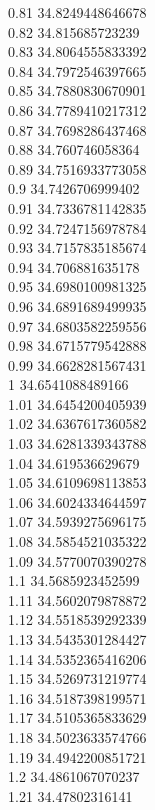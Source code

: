 {0.81	34.8249448646678\\
0.82	34.815685723239\\
0.83	34.8064555833392\\
0.84	34.7972546397665\\
0.85	34.7880830670901\\
0.86	34.7789410217312\\
0.87	34.7698286437468\\
0.88	34.760746058364\\
0.89	34.7516933773058\\
0.9	34.7426706999402\\
0.91	34.7336781142835\\
0.92	34.7247156978784\\
0.93	34.7157835185674\\
0.94	34.706881635178\\
0.95	34.6980100981325\\
0.96	34.6891689499935\\
0.97	34.6803582259556\\
0.98	34.6715779542888\\
0.99	34.6628281567431\\
1	34.6541088489166\\
1.01	34.6454200405939\\
1.02	34.6367617360582\\
1.03	34.6281339343788\\
1.04	34.619536629679\\
1.05	34.6109698113853\\
1.06	34.6024334644597\\
1.07	34.5939275696175\\
1.08	34.5854521035322\\
1.09	34.5770070390278\\
1.1	34.5685923452599\\
1.11	34.5602079878872\\
1.12	34.5518539292339\\
1.13	34.5435301284427\\
1.14	34.5352365416206\\
1.15	34.5269731219774\\
1.16	34.5187398199571\\
1.17	34.5105365833629\\
1.18	34.5023633574766\\
1.19	34.4942200851721\\
1.2	34.4861067070237\\
1.21	34.47802316141\\
}
